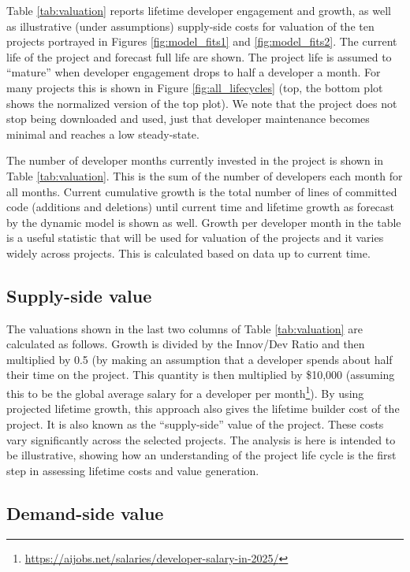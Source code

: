\documentclass[conference]{IEEEtran}
\begin{document}
Table \ref{tab:valuation} reports lifetime developer engagement and growth, as well as illustrative (under assumptions) supply-side costs for valuation of the ten projects portrayed in Figures \ref{fig:model_fits1} and \ref{fig:model_fits2}. The current life of the project and forecast full life are shown. The project life is assumed to ``mature'' when developer engagement drops to half a developer a month. For many projects this is shown in Figure \ref{fig:all_lifecycles} (top, the bottom plot shows the normalized version of the top plot). We note that the project does not stop being downloaded and used, just that developer maintenance becomes minimal and reaches a low steady-state. 

The number of developer months currently invested in the project is shown in Table \ref{tab:valuation}. This is the sum of the number of developers each month for all months. Current cumulative growth is the total number of lines of committed code (additions and deletions) until current time and lifetime growth as forecast by the dynamic model is shown as well. Growth per developer month in the table is a useful statistic that will be used for valuation of the projects and it varies widely across projects. This is calculated based on data up to current time. 

\subsection{Supply-side value}

The valuations shown in the last two columns of Table \ref{tab:valuation} are calculated as follows. Growth is divided by the Innov/Dev Ratio and then multiplied by 0.5 (by making an assumption that a developer spends about half their time on the project. This quantity is then multiplied by \$10,000 (assuming this to be the global average salary for a developer per month\footnote{\url{https://aijobs.net/salaries/developer-salary-in-2025/}}). By using projected lifetime growth, this approach also gives the lifetime builder cost of the project. It is also known as the ``supply-side'' value of the project. These costs vary significantly across the selected projects. The analysis is here is intended to be illustrative, showing how an understanding of the project life cycle is the first step in assessing lifetime costs and value generation. 

\subsection{Demand-side value}
\end{document}
